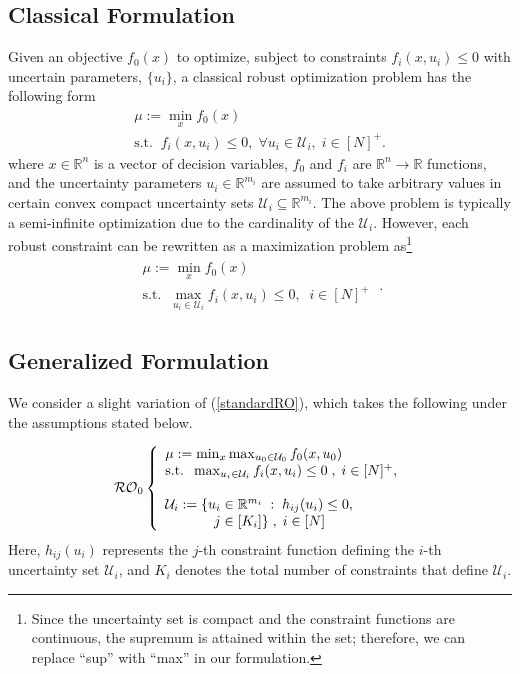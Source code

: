 \documentclass[journal,twoside,web]{ieeecolor}
\newcommand{\rev}[1]{\textcolor{revisionblue}{#1}}
\newcommand{\real}{\mathbb{R}}
\begin{document}
\subsection*{\rev{Classical Formulation}}
Given an objective $f_0(x)$ to optimize, subject to constraints $f_i(x,u_i) \leq 0$ with uncertain parameters, $\{u_i\}$, a classical robust optimization problem has the following form
$$
\begin{array}{l}
\mu:=\min_{x} f_0(x)\\
\text{s.t.}\;\;f_i(x,u_i)\leq 0,\; \forall u_i\in \mathcal{U}_i,\;i\in[N]^+.
\end{array}
$$
where $x\in \real^n$ is a vector of decision variables, $f_0$ and $f_i$ are $\real^n \to \real$ functions, and the uncertainty parameters $u_i \in \real^{m_i}$ are assumed to take arbitrary values in certain convex compact uncertainty sets $\mathcal{U}_i \subseteq \real^{m_i}$.
The above problem is typically a semi-infinite optimization due to the cardinality of the $\mathcal{U}_i$. However, each robust constraint can be rewritten as a maximization problem as\footnote{\rev{Since the uncertainty set is compact and the constraint functions are continuous, the supremum is attained within the set; therefore, we can replace ``sup'' with ``max'' in our formulation.}}
\begin{align}
\begin{array}{l}
\mu:=\min_{x} f_0(x)\\
\text{s.t.}\;\;\max_{u_i\in \mathcal{U}_i} f_i(x,u_i)\leq 0,\;\;i\in[N]^+
\end{array}\;.\label{standardRO}
\end{align}

\subsection*{\rev{Generalized Formulation}}

We consider a slight variation of (\ref{standardRO}), which takes the following under the assumptions stated below.

\begin{equation}\label{RO0}
\mathcal{RO}_0\left\{ \begin{array}{l}
\mu:=\min_{x} \max_{u_0\in \mathcal{U}_0} f_0(x,u_0)\\
\text{s.t.}\;\;\max_{u_i\in \mathcal{U}_i} f_i(x,u_i)\leq 0\;,\;i\in[N]^+,\\ \\
\mathcal{U}_i:=\{u_i\in \mathbb{R}^{m_i}\;:\;h_{ij}(u_i)\leq 0,\\
\hspace{3.5em} j\in[K_i]\}\;,\;i\in[N]
\end{array}\right.
\end{equation}
\rev{Here, $h_{ij}(u_i)$ represents the $j$-th constraint function defining the $i$-th uncertainty set $\mathcal{U}_i$, and $K_i$ denotes the total number of constraints that define $\mathcal{U}_i$.} 
\end{document}
